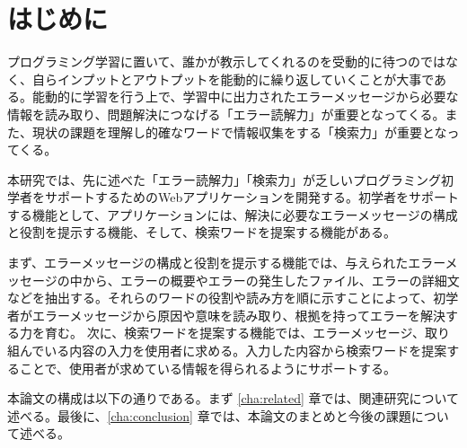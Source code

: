 \documentclass[main]{subfiles}
\begin{document}
\chapter{はじめに}
\label{cha:intro}

プログラミング学習に置いて、誰かが教示してくれるのを受動的に待つのではなく、自らインプットとアウトプットを能動的に繰り返していくことが大事である。能動的に学習を行う上で、学習中に出力されたエラーメッセージから必要な情報を読み取り、問題解決につなげる「エラー読解力」が重要となってくる。また、現状の課題を理解し的確なワードで情報収集をする「検索力」が重要となってくる。

本研究では、先に述べた「エラー読解力」「検索力」が乏しいプログラミング初学者をサポートするためのWebアプリケーションを開発する。初学者をサポートする機能として、アプリケーションには、解決に必要なエラーメッセージの構成と役割を提示する機能、そして、検索ワードを提案する機能がある。

まず、エラーメッセージの構成と役割を提示する機能では、与えられたエラーメッセージの中から、エラーの概要やエラーの発生したファイル、エラーの詳細文などを抽出する。それらのワードの役割や読み方を順に示すことによって、初学者がエラーメッセージから原因や意味を読み取り、根拠を持ってエラーを解決する力を育む。
次に、検索ワードを提案する機能では、エラーメッセージ、取り組んでいる内容の入力を使用者に求める。入力した内容から検索ワードを提案することで、使用者が求めている情報を得られるようにサポートする。


本論文の構成は以下の通りである。まず \ref{cha:related} 章では、関連研究について述べる。最後に、\ref{cha:conclusion} 章では、本論文のまとめと今後の課題について述べる。
\end{document}
